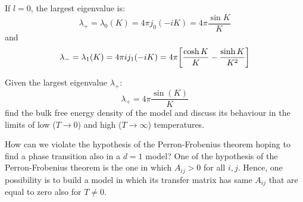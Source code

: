\documentclass[../main/main.tex]{subfiles}
\begin{document}
If \( l=0 \), the largest eigenvalue is:
\begin{equation}
  \lambda _+ = \lambda _0 (K) = 4 \pi j_0 (-iK) = 4 \pi \frac{\sin K }{K}
\end{equation}
and
\begin{equation}
  \lambda _- = \lambda _1 (K) = 4 \pi i j_1 (-iK) = 4 \pi \qty[\frac{\cosh K }{K}-\frac{\sinh K }{K^2}]
\end{equation}

\begin{exercise}{}{}
Given the largest eigenvalue \( \lambda _+ \):
\begin{equation}
  \lambda _+ = 4 \pi \frac{\sin(K) }{K}
\end{equation}
find the bulk free energy density of the model and discuss its behaviour in the limits of low (\( T \rightarrow 0 \)) and high (\( T \rightarrow \infty  \)) temperatures.
\end{exercise}


How can we violate the hypothesis of the Perron-Frobenius theorem hoping to find a phase transition also in a \( d=1 \) model?
 One of the hypothesis of the Perron-Frobenius theorem is the one in which \( A_{ij}>0  \) for all \(i,j \). Hence, one possibility is to build a model in which its transfer matrix has same \( A_{ij} \) that are equal to zero also for \( T \neq 0 \).
\end{document}
